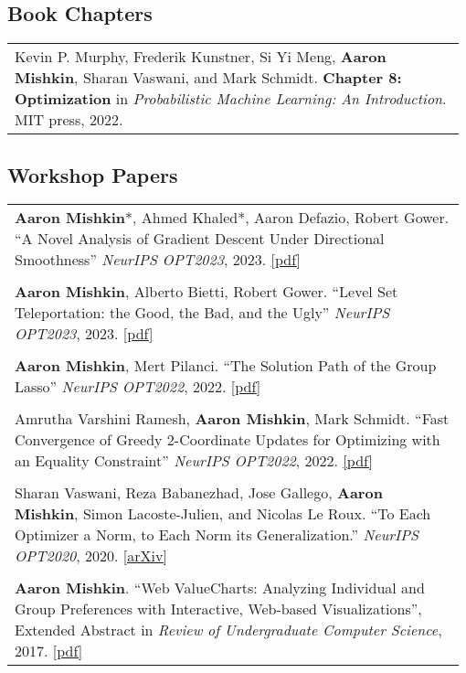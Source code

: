 \documentclass[10pt]{article}
\begin{document}
\subsection*{Book Chapters}

\begin{longtable}{L{0.98\linewidth}}
    Kevin P.
    Murphy, Frederik Kunstner, Si Yi Meng, \textbf{Aaron Mishkin}, Sharan Vaswani,
    and Mark Schmidt.
    \textbf{Chapter 8: Optimization} in \textit{Probabilistic Machine Learning: An
        Introduction}.
    MIT press, 2022.
\end{longtable}

\subsection*{Workshop Papers}

\begin{longtable}{L{0.98\linewidth}}
    \textbf{Aaron Mishkin}*, Ahmed Khaled*, Aaron Defazio, Robert Gower. ``A Novel Analysis of Gradient Descent Under Directional Smoothness'' \textit{NeurIPS OPT2023}, 2023. \href{https://opt-ml.org/papers/2023/paper77.pdf}{[pdf]} \\  \\
    \textbf{Aaron Mishkin}, Alberto Bietti, Robert Gower. ``Level Set Teleportation: the Good, the Bad, and the Ugly'' \textit{NeurIPS OPT2023}, 2023. \href{https://opt-ml.org/papers/2023/paper35.pdf}{[pdf]}                         \\  \\
    \textbf{Aaron Mishkin}, Mert Pilanci. ``The Solution Path of the Group Lasso'' \textit{NeurIPS OPT2022}, 2022. \href{https://opt-ml.org/papers/2022/paper63.pdf}{[pdf]}                                                             \\  \\
    Amrutha Varshini Ramesh, \textbf{Aaron Mishkin}, Mark Schmidt.
    ``Fast Convergence of Greedy 2-Coordinate Updates for Optimizing with an Equality Constraint'' \textit{NeurIPS OPT2022}, 2022. \href{https://opt-ml.org/papers/2022/paper82.pdf}{[pdf]}                                             \\  \\
    Sharan Vaswani, Reza Babanezhad, Jose Gallego, \textbf{Aaron Mishkin}, Simon
    Lacoste-Julien, and Nicolas Le Roux.
    ``To Each Optimizer a Norm, to Each Norm its Generalization.'' \textit{NeurIPS OPT2020}, 2020. \href{https://arxiv.org/abs/2006.06821}{[arXiv]}                                                                                     \\  \\
    \textbf{Aaron Mishkin}. ``Web ValueCharts: Analyzing Individual and Group Preferences with Interactive, Web-based Visualizations'', Extended Abstract in \textit{Review of Undergraduate Computer Science}, 2017. \href{https://www.cs.ubc.ca/~amishkin/amishkinVCExtendedAbstract.pdf}{[pdf]}
\end{longtable}
\vspace{-1ex}
\end{document}
